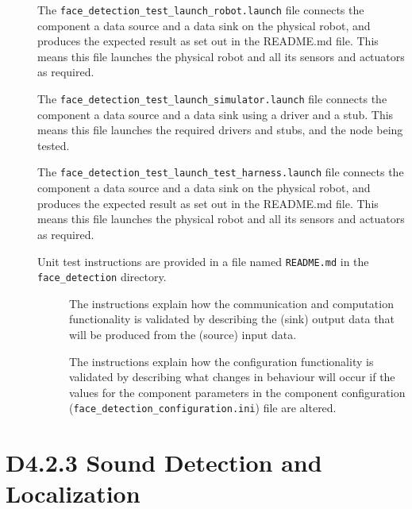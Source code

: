 \documentclass{CSSRforAfrica}
\newcommand{\checkboxChecked}{\fbox{\ding{51}}} %
\newcommand{\checkboxDashed}{\fbox{--}}         %
\begin{document}
\begin{description}
\item[\checkboxChecked] The {\small \verb+face_detection_test_launch_robot.launch+} file connects the component a data source and a data sink on the physical robot, and produces the expected result as set out in the README.md file. This means this file launches the physical robot and all its sensors and actuators as required.

\item[\checkboxDashed]   The {\small \verb+face_detection_test_launch_simulator.launch+} file connects the component a data source and a data sink using a driver and a stub. This means this file launches the required drivers and stubs, and the node being tested.

\item[\checkboxChecked]   The {\small \verb+face_detection_test_launch_test_harness.launch+} file connects the component a data source and a data sink on the physical robot, and produces the expected result as set out in the README.md file. This means this file launches the physical robot and all its sensors and actuators as required.

\item[\checkboxChecked] Unit test instructions are provided in a file named {\small \verb+README.md+} in the  {\small \verb+face_detection+} directory. 


\begin{description}

\item[\checkboxChecked] The instructions explain how the communication and computation functionality is validated by describing the (sink) output data that will be produced from the (source) input data.  

\item[\checkboxChecked] The instructions explain how the configuration functionality is validated by describing what changes in behaviour will occur if the values for the component parameters in the component configuration ({\small \verb+face_detection_configuration.ini+}) file are altered.

\end{description}

\end{description} 



 \newpage
 \section{D4.2.3 Sound Detection and Localization} 
\end{document}
